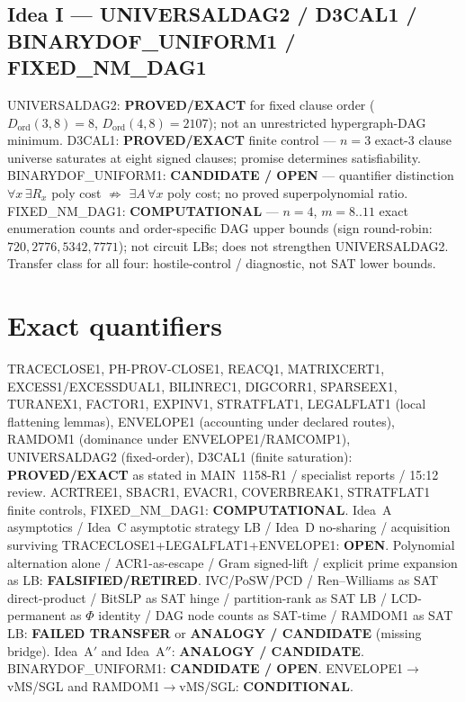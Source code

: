 \documentclass[11pt]{article}
\begin{document}
\subsection*{Idea I --- UNIVERSALDAG2 / D3CAL1 / BINARYDOF\_UNIFORM1 / FIXED\_NM\_DAG1}
UNIVERSALDAG2: \textbf{PROVED/EXACT} for fixed clause order
($D_{\mathrm{ord}}(3,8)=8$, $D_{\mathrm{ord}}(4,8)=2107$); not an unrestricted hypergraph-DAG minimum.
D3CAL1: \textbf{PROVED/EXACT} finite control --- $n=3$ exact-3 clause universe saturates at
eight signed clauses; promise determines satisfiability.
BINARYDOF\_UNIFORM1: \textbf{CANDIDATE / OPEN} --- quantifier distinction
$\forall x\,\exists R_x$ poly cost $\not\Rightarrow$ $\exists A\,\forall x$ poly cost; no proved
superpolynomial ratio.
FIXED\_NM\_DAG1: \textbf{COMPUTATIONAL} --- $n{=}4$, $m=8..11$ exact enumeration counts and
order-specific DAG upper bounds (sign round-robin: $720,2776,5342,7771$); not circuit LBs;
does not strengthen UNIVERSALDAG2.
Transfer class for all four: hostile-control / diagnostic, not SAT lower bounds.

\section*{Exact quantifiers}
TRACECLOSE1, PH-PROV-CLOSE1, REACQ1, MATRIXCERT1, EXCESS1/EXCESSDUAL1, BILINREC1, DIGCORR1,
SPARSEEX1, TURANEX1, FACTOR1, EXPINV1, STRATFLAT1, LEGALFLAT1 (local flattening lemmas),
ENVELOPE1 (accounting under declared routes), RAMDOM1 (dominance under ENVELOPE1/RAMCOMP1),
UNIVERSALDAG2 (fixed-order), D3CAL1 (finite saturation): \textbf{PROVED/EXACT} as stated in
MAIN~1158-R1 / specialist reports / 15:12 review.
ACRTREE1, SBACR1, EVACR1, COVERBREAK1, STRATFLAT1 finite controls, FIXED\_NM\_DAG1:
\textbf{COMPUTATIONAL}.
Idea~A asymptotics / Idea~C asymptotic strategy LB / Idea~D no-sharing / acquisition surviving
TRACECLOSE1+LEGALFLAT1+ENVELOPE1: \textbf{OPEN}.
Polynomial alternation alone / ACR1-as-escape / Gram signed-lift / explicit prime expansion as LB:
\textbf{FALSIFIED/RETIRED}.
IVC/PoSW/PCD / Ren--Williams as SAT direct-product / BitSLP as SAT hinge / partition-rank as
SAT LB / LCD-permanent as $\Phi$ identity / DAG node counts as SAT-time / RAMDOM1 as SAT LB:
\textbf{FAILED TRANSFER} or \textbf{ANALOGY / CANDIDATE} (missing bridge).
Idea~A$'$ and Idea~A$''$: \textbf{ANALOGY / CANDIDATE}.
BINARYDOF\_UNIFORM1: \textbf{CANDIDATE / OPEN}.
ENVELOPE1$\to$vMS/SGL and RAMDOM1$\to$vMS/SGL: \textbf{CONDITIONAL}.
\end{document}
